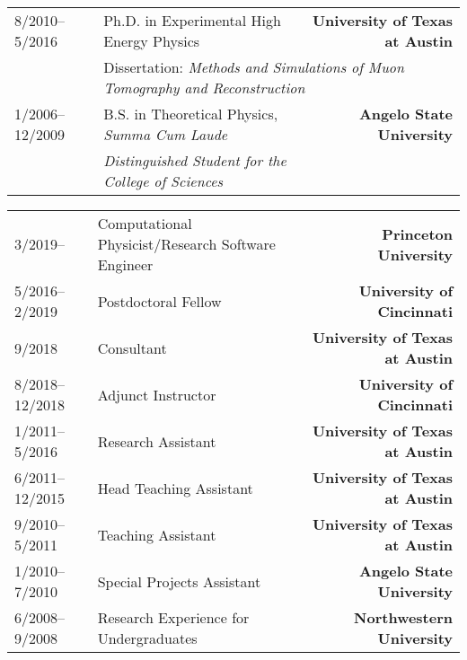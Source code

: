 \documentclass[10pt,letterpaper]{moderncv}
\begin{document}
\let\oldnullthing\null
\renewcommand{\null}{}
\makecvtitle
\renewcommand{\null}{\oldnullthing}
\vspace*{-10mm}


\begin{tabularx}{\textwidth}{p{1.1in}X>{\bfseries}r}
	8/2010--5/2016 & Ph.D. in Experimental High Energy Physics &  University of Texas at Austin \\
	& \multicolumn{2}{l}{Dissertation: \textit{Methods and Simulations of Muon Tomography and Reconstruction}} \\[1ex]
	1/2006--12/2009 & B.S. in Theoretical Physics, \textit{Summa Cum Laude} & Angelo State University \\
	& \textit{Distinguished Student for the College of Sciences} & \\
\end{tabularx}


\begin{tabularx}{\textwidth}{p{1.1in}X>{\bfseries}r}
    3/2019-- & Computational Physicist/Research Software Engineer & Princeton University \\
	5/2016--2/2019 & Postdoctoral Fellow &  University of Cincinnati \\
	9/2018 & Consultant & University of Texas at Austin \\
	8/2018--12/2018 & Adjunct Instructor &  University of Cincinnati \\
	1/2011--5/2016 & Research Assistant & University of Texas at Austin \\
	6/2011--12/2015 & Head Teaching Assistant & University of Texas at Austin \\
	9/2010--5/2011 & Teaching Assistant & University of Texas at Austin \\
	1/2010--7/2010 & Special Projects Assistant & Angelo State University \\
	6/2008--9/2008 & Research Experience for Undergraduates & Northwestern University \\
\end{tabularx}

\begin{comment}
\subsection{Other research projects}

\begin{tabularx}{\textwidth}{p{1.1in}X>{\bfseries}r}
	2009 & Wavelet methods and their use in imaging and compression &  Angelo State University \\
	2007--2009 & Mapped the Dagger Mountain Anticline in Big Bend, TX & Angelo State University \\
	2007 & Characterization of near earth objects via orbital perturbations & Angelo State University \\
\end{tabularx}
\end{comment}
\end{document}

